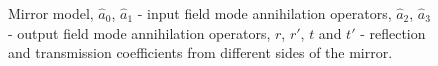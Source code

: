 \begin{figure}
\centering



\caption{Mirror model, $\hat{a}_0$, $\hat{a}_1$ - input field mode annihilation operators, $\hat{a}_2$, $\hat{a}_3$ - output field mode annihilation operators, $r$, $r'$, $t$ and $t'$ - reflection and transmission coefficients from different sides of the mirror.}
\label{figPart2Interfero_1}
\end{figure}